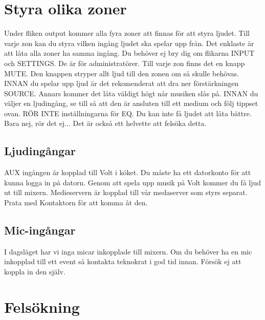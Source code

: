 \documentclass[10pt]{article}
\begin{document}
    \section{Styra olika zoner}
        Under fliken output kommer alla fyra zoner att finnas för att styra ljudet. Till varje zon kan du styra vilken ingång ljudet ska spelar upp från. Det enklaste är att låta alla zoner ha samma ingång. Du behöver ej bry dig om flikarna INPUT och SETTINGS. De är för administratörer.
        \newline \newline
        Till varje zon finns det en knapp MUTE. Den knappen stryper allt ljud till den zonen om så skulle behövas.
        \newline \newline
        INNAN du spelar upp ljud är det rekomenderat att dra ner förstärkningen SOURCE. Annars kommer det låta väldigt högt når musiken slås på.
        \newline \newline
        INNAN du väljer en ljudingång, se till så att den är ansluten till ett medium och följ tippset ovan. 
        \newline \newline
        RÖR INTE inställningarna för EQ. Du kan inte få ljudet att låta bättre. Bara nej, rör det ej... Det är också ett helvette att felsöka detta.
    \subsection{Ljudingångar}
        AUX ingången är kopplad till Volt i köket. Du måste ha ett datorkonto för att kunna logga in på datorn. Genom att spela upp musik på Volt kommer du få ljud ut till mixern.
        \newline \newline
        Medieservern är kopplad till vår medaserver som styrs separat. Prata med Kontaktorn för att komma åt den.
    \subsection{Mic-ingångar}
        I dagsläget har vi inga micar inkopplade till mixern. Om du behöver ha en mic inkopplad till ett event så kontakta teknokrat i god tid innan. Försök ej att koppla in den själv.
    
    \section{Felsökning}
\end{document}
